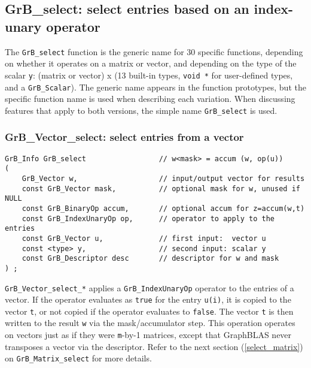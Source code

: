 \documentclass[12pt]{article}
\begin{document}
{\newpage
\subsection{{\sf GrB\_select:} select entries based on an index-unary operator}
\label{select}

The \verb'GrB_select' function is the generic name for 30 specific functions,
depending on whether it operates on a matrix or vector, and depending on the
type of the scalar \verb'y': (matrix or vector) x (13 built-in types,
\verb'void *' for user-defined types, and a \verb'GrB_Scalar').  The generic
name appears in the function prototypes, but the specific function name is used
when describing each variation.  When discussing features that apply to both
versions, the simple name \verb'GrB_select' is used.

\subsubsection{{\sf GrB\_Vector\_select:} select entries from a vector}
\label{select_vector}

\begin{mdframed}[userdefinedwidth=6in]
{\footnotesize
\begin{verbatim}
GrB_Info GrB_select                 // w<mask> = accum (w, op(u))
(
    GrB_Vector w,                   // input/output vector for results
    const GrB_Vector mask,          // optional mask for w, unused if NULL
    const GrB_BinaryOp accum,       // optional accum for z=accum(w,t)
    const GrB_IndexUnaryOp op,      // operator to apply to the entries
    const GrB_Vector u,             // first input:  vector u
    const <type> y,                 // second input: scalar y
    const GrB_Descriptor desc       // descriptor for w and mask
) ;
\end{verbatim} } \end{mdframed}

\verb'GrB_Vector_select_*' applies a \verb'GrB_IndexUnaryOp' operator to the
entries of a vector.  If the operator evaluates as \verb'true' for the entry
\verb'u(i)', it is copied to the vector \verb't', or not copied if the operator
evaluates to \verb'false'.   The vector \verb't' is then written to the result
\verb'w' via the mask/accumulator step.  This operation operates on vectors
just as if they were \verb'm'-by-1 matrices, except that GraphBLAS never
transposes a vector via the descriptor.  Refer to the next section
(\ref{select_matrix}) on \verb'GrB_Matrix_select' for more details.

}
\end{document}
